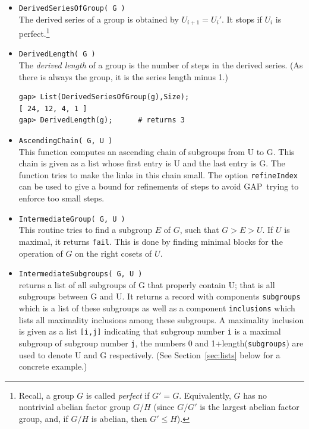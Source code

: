 \documentclass[11pt]{amsart}
\newcommand{\gap}{GAP}   %
\theoremstyle{plain}
\newcommand{\codesize}{\footnotesize}
\newcommand{\<}{\ensuremath{\langle}}
\renewcommand{\>}{\ensuremath{\rangle}}
\renewcommand{\leq}{\ensuremath{\leqslant}}
\begin{document}
\begin{itemize}
{\begin{verbatim}
[ Group([ (3,4), (2,4,3), (1,4)(2,3), (1,3)(2,4) ]),
Group([ (2,4,3), (1,4)(2,3), (1,3)(2,4) ]),
Group([ (1,4)(2,3), (1,3)(2,4) ]), Group([ (1,3)(2,4) ]), Group(()) ]
gap> DisplayCompositionSeries(Group((1,2,3,4,5,6,7),(1,2)));
G (2 gens, size 5040)
| Z(2)
S (5 gens, size 2520)
| A(7)
1 (0 gens, size 1)
\end{verbatim}}
\item {\tt DerivedSeriesOfGroup( G )}\\[2pt] 
The derived series of a group is obtained by $U_{i+1} = U_i'$. It stops if $U_i$ is
perfect.\footnote{Recall, a group $G$ is called \emph{perfect} if $G' = G$.
  Equivalently, $G$ has no nontrivial abelian factor group $G/H$ (since $G/G'$ is the
  largest abelian factor group, and, if $G/H$ is abelian, then $G'\leq H$).}
\item {\tt DerivedLength( G )}\\[2pt] 
The \emph{derived length} of a group is the number of steps in the derived series. (As there is always the group, it
is the series length minus 1.)
{\codesize
\begin{verbatim}
gap> List(DerivedSeriesOfGroup(g),Size);
[ 24, 12, 4, 1 ]
gap> DerivedLength(g);      # returns 3
\end{verbatim}}
\item {\tt AscendingChain( G, U )}\\[2pt] 
This function computes an ascending chain of subgroups from U to G. This chain is given as a list whose
first entry is U and the last entry is G. The function tries to make the links in this chain small.
The option {\tt refineIndex} can be used to give a bound for refinements of steps to avoid \gap\ trying to enforce
too small steps.
\item {\tt IntermediateGroup( G, U )}\\[2pt] 
This routine tries to find a subgroup $E$ of $G$, such that $G > E > U$. If $U$ is maximal,
it returns {\tt fail}. This is done by finding minimal blocks for the operation of $G$ on the right cosets of $U$.
\item {\tt IntermediateSubgroups( G, U )}\\[2pt] 
returns a list of all subgroups of G that properly contain U; that is all subgroups between G and U. It
returns a record with components {\tt subgroups} which is a list of these subgroups as well as a component
{\tt inclusions} which lists all maximality inclusions among these subgroups. A maximality inclusion is given as
a list {\tt [i,j]} indicating that subgroup number {\tt i} is a maximal subgroup
of subgroup number {\tt j}, the numbers 0 and 1+length({\tt subgroups}) are used
to denote U and G respectively.
(See Section~\ref{sec:lists} below for a concrete example.)
\end{itemize}
\end{document}
